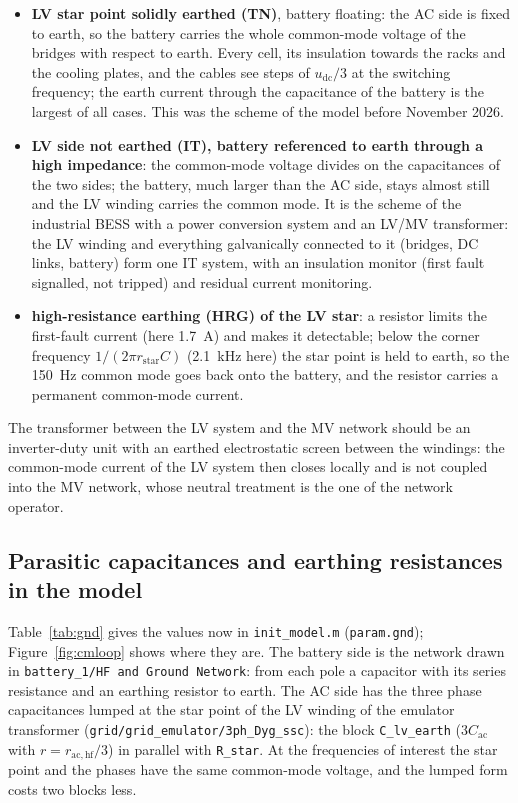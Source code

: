 \documentclass[11pt,a4paper]{scrartcl}
\newcommand{\ped}[1]{_{\mathrm{#1}}}
\newcommand{\code}[1]{\texttt{#1}}
\begin{document}
\begin{onehalfspace}
\begin{itemize}[nosep]
	\item \textbf{LV star point solidly earthed (TN)}, battery floating: the AC side is fixed to earth, so the battery carries the whole common-mode voltage of the bridges with respect to earth. Every cell, its insulation towards the racks and the cooling plates, and the cables see steps of $u\ped{dc}/3$ at the switching frequency; the earth current through the capacitance of the battery is the largest of all cases. This was the scheme of the model before November 2026.
	\item \textbf{LV side not earthed (IT), battery referenced to earth through a high impedance}: the common-mode voltage divides on the capacitances of the two sides; the battery, much larger than the AC side, stays almost still and the LV winding carries the common mode. It is the scheme of the industrial BESS with a power conversion system and an LV/MV transformer: the LV winding and everything galvanically connected to it (bridges, DC links, battery) form one IT system, with an insulation monitor (first fault signalled, not tripped) and residual current monitoring.
	\item \textbf{high-resistance earthing (HRG) of the LV star}: a resistor limits the first-fault current (here \SI{1.7}{A}) and makes it detectable; below the corner frequency $1/(2\pi r\ped{star} C)$ (\SI{2.1}{kHz} here) the star point is held to earth, so the \SI{150}{Hz} common mode goes back onto the battery, and the resistor carries a permanent common-mode current.
\end{itemize}

The transformer between the LV system and the MV network should be an inverter-duty unit with an earthed electrostatic screen between the windings: the common-mode current of the LV system then closes locally and is not coupled into the MV network, whose neutral treatment is the one of the network operator.

\subsection{Parasitic capacitances and earthing resistances in the model}

Table~\ref{tab:gnd} gives the values now in \code{init\_model.m} (\code{param.gnd}); Figure~\ref{fig:cmloop} shows where they are. The battery side is the network drawn in \code{battery\_1/HF and Ground Network}: from each pole a capacitor with its series resistance and an earthing resistor to earth. The AC side has the three phase capacitances lumped at the star point of the LV winding of the emulator transformer (\code{grid/grid\_emulator/3ph\_Dyg\_ssc}): the block \code{C\_lv\_earth} ($3C\ped{ac}$ with $r = r\ped{ac,hf}/3$) in parallel with \code{R\_star}. At the frequencies of interest the star point and the phases have the same common-mode voltage, and the lumped form costs two blocks less.


\end{onehalfspace}
\end{document}
